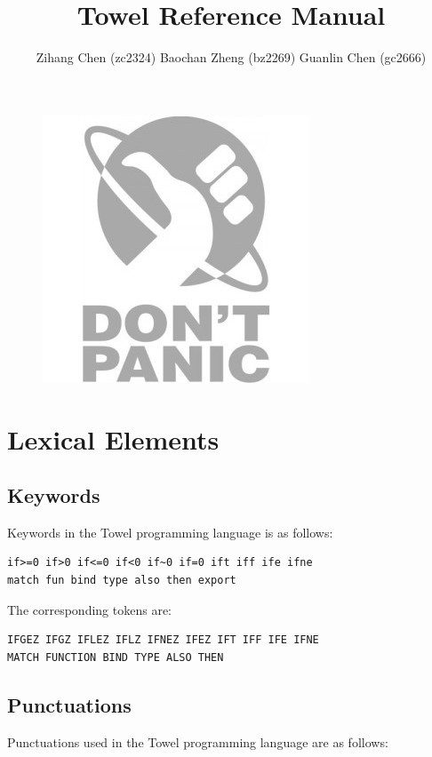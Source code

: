 \documentclass{book}
\title{Towel Reference Manual}
\author{Zihang Chen (zc2324) Baochan Zheng (bz2269) Guanlin Chen (gc2666)}
\begin{document}
\maketitle

\vspace{10cm}
\begin{figure}
\centerline{\includegraphics[scale=0.75]{images.jpg}}
\end{figure}
\newpage

\tableofcontents

\chapter{Lexical Elements}\label{chap:grammar}
\section{Keywords}

Keywords in the Towel programming language is as follows:
\begin{verbatim}
if>=0 if>0 if<=0 if<0 if~0 if=0 ift iff ife ifne
match fun bind type also then export
\end{verbatim}

The corresponding tokens are:
\begin{verbatim}
IFGEZ IFGZ IFLEZ IFLZ IFNEZ IFEZ IFT IFF IFE IFNE
MATCH FUNCTION BIND TYPE ALSO THEN
\end{verbatim}

\section{Punctuations}

Punctuations used in the Towel programming language are as follows:
\end{document}

